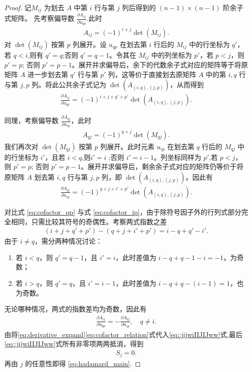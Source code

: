 \documentclass[../../main.tex]{subfiles}%
\begin{document}
\begin{proof}
记\(M_{ij}\) 为划去 \(A\) 中第 \(i\) 行与第 \(j\) 列后得到的 \((n-1)\times(n-1)\) 阶余子式矩阵。
先考察偏导数 \(\frac{\partial A_{ij}}{\partial u_{qp}}\).此时
\begin{align*}
A_{ij} = (-1)^{i+j} \det(M_{ij}).
\end{align*}
对 \(\det(M_{ij})\) 按第 \(p\) 列展开。设 \(u_{qp}\) 在划去第 \(i\) 行后的 \(M_{ij}\) 中的行坐标为 \(q'\)，若 \(q < i\),则有 \(q' = q\);否则 \(q' = q-1\)。令其在 \(M_{ij}\) 中的列坐标为 \(p'\)，若 \(p < j\)，则 \(p' = p\); 否则 \(p' = p-1\)。展开并求偏导后，余下的代数余子式对应的矩阵等于将原矩阵 \(A\) 进一步划去第 \(q'\) 行与第 \(p'\) 列，这等价于直接划去原矩阵 \(A\) 中的第 \(i, q\) 行与第 \(j, p\) 列。将此公共余子式记为 \(\det(A_{(i,q),(j,p)})\)，从而得到
\begin{align}
\frac{\partial A_{ij}}{\partial u_{qp}} = (-1)^{i+j+q'+p'} \det(A_{(i,q),(j,p)}). \label{eq:cofactor_qp}
\end{align}

同理，考察偏导数 \(\frac{\partial A_{qj}}{\partial u_{ip}}\)，此时
\begin{align*}
A_{qj} = (-1)^{q+j} \det(M_{qj}).
\end{align*}
我们再次对 \(\det(M_{qj})\) 按第 \(p\) 列展开。此时元素 \(u_{ip}\) 在划去第 \(q\) 行后的 \(M_{qj}\) 中的行坐标为 \(i'\)，且若 \(i < q\),则\(i' = i\) ;否则 \(i' = i-1\)。列坐标同样为 \(p'\),若 \(p < j\)，则 \(p' = p\); 否则 \(p' = p-1\)。展开并求偏导后，剩余余子式对应的矩阵仍等价于将原矩阵 \(A\) 划去第 \(i, q\) 行与第 \(j, p\) 列，即 \(\det(A_{(i,q),(j,p)})\)。因此有
\begin{align*}
\frac{\partial A_{qj}}{\partial u_{ip}} = (-1)^{q+j+i'+p'} \det(A_{(i,q),(j,p)}). 
\end{align*}

对比式 \eqref{eq:cofactor_qp} 与式 \eqref{eq:cofactor_ip}，由于除符号因子外的行列式部分完全相同，只需比较其符号的奇偶性。考察两式指数之差
\begin{align*}
(i + j + q' + p') - (q + j + i' + p') = i - q + q' - i'.
\end{align*}
由于 \(i \neq q\)，需分两种情况讨论：
\begin{enumerate}[(1)]
\item 若 \(i < q\)，则 \(q' = q-1\)，且 \(i' = i\)，此时差值为 \(i - q + q - 1 - i = -1\)，为奇数；
\item 若 \(i > q\)，则 \(q' = q\)，且 \(i' = i-1\)，此时差值为 \(i - q + q - (i - 1) = 1\)，也为奇数。
\end{enumerate}
无论哪种情况，两式的指数差均为奇数，因此有
\begin{align}
\frac{\partial A_{ij}}{\partial u_{qp}} = -\frac{\partial A_{qj}}{\partial u_{ip}},\quad q\neq i.\label{eq:cofactor_ip}
\end{align}
由将\eqref{eq:derivative_expand}\eqref{eq:cofactor_relation}式代入\eqref{eq::jijwiIIJIJww}式,最后\eqref{eq::jijwiIIJIJww}式所有非零项两两抵消，得到
\begin{align*}
S_j=0. 
\end{align*}
再由 $j$ 的任意性即得 \eqref{eq:hadamard_main}.
\end{proof}
\end{document}
